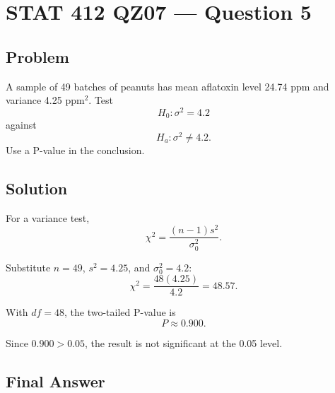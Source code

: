 \documentclass[11pt]{article}
\begin{document}
\section*{STAT 412 QZ07 --- Question 5}

\subsection*{Problem}

A sample of 49 batches of peanuts has mean aflatoxin level 24.74 ppm and variance 4.25 ppm$^2$. Test
\[
H_0:\sigma^2=4.2
\]
against
\[
H_a:\sigma^2\ne4.2.
\]
Use a P-value in the conclusion.

\subsection*{Solution}

For a variance test,
\[
\chi^2=\frac{(n-1)s^2}{\sigma_0^2}.
\]

Substitute $n=49$, $s^2=4.25$, and $\sigma_0^2=4.2$:
\[
\chi^2=\frac{48(4.25)}{4.2}=48.57.
\]

With $df=48$, the two-tailed P-value is
\[
P\approx 0.900.
\]

Since $0.900>0.05$, the result is not significant at the 0.05 level.

\subsection*{Final Answer}

\end{document}
